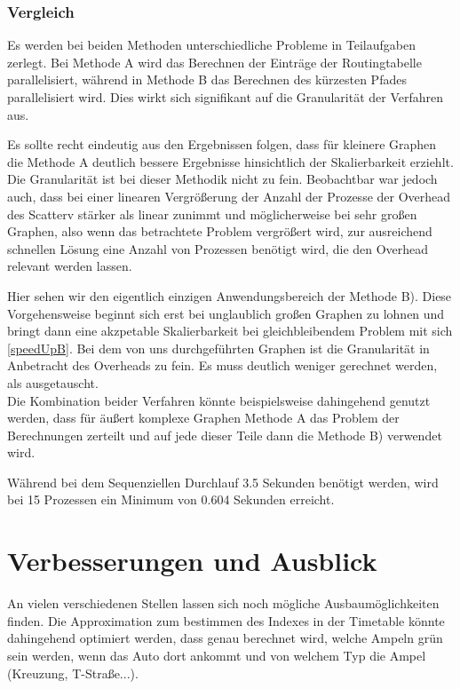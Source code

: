 \documentclass[paper=A4,pagesize=auto,12pt,headinclude=true,footinclude=true,BCOR=0mm,DIV=calc]{scrartcl}
\begin{document}
	\subsubsection{Vergleich}
	Es werden bei beiden Methoden unterschiedliche Probleme in Teilaufgaben zerlegt. Bei Methode A wird das Berechnen der Einträge der Routingtabelle parallelisiert, während in Methode B das Berechnen des kürzesten Pfades parallelisiert wird. Dies wirkt sich signifikant auf die Granularität der Verfahren aus.
	
	Es sollte recht eindeutig aus den Ergebnissen folgen, dass für kleinere Graphen die Methode A deutlich bessere Ergebnisse hinsichtlich der Skalierbarkeit erziehlt. Die Granularität ist bei dieser Methodik nicht zu fein. Beobachtbar war jedoch auch, dass bei einer linearen Vergrößerung der Anzahl der Prozesse der Overhead des Scatterv stärker als linear zunimmt und möglicherweise bei sehr großen Graphen, also wenn das betrachtete Problem vergrößert wird, zur ausreichend schnellen Lösung eine Anzahl von Prozessen benötigt wird, die den Overhead relevant werden lassen.
	
	Hier sehen wir den eigentlich einzigen Anwendungsbereich der Methode B). Diese Vorgehensweise beginnt sich erst bei unglaublich großen Graphen zu lohnen und bringt dann eine akzpetable Skalierbarkeit bei gleichbleibendem Problem mit sich \ref{speedUpB}. Bei dem von uns durchgeführten Graphen ist die Granularität in Anbetracht des Overheads zu fein. Es muss deutlich weniger gerechnet werden, als ausgetauscht.\\
	Die Kombination beider Verfahren könnte beispielsweise dahingehend genutzt werden, dass für äußert komplexe Graphen Methode A das Problem der Berechnungen zerteilt und auf jede dieser Teile dann die Methode B) verwendet wird.

	
	
	
	
	
	
	Während bei dem Sequenziellen Durchlauf 3.5 Sekunden benötigt werden, wird bei 15 Prozessen ein Minimum von 0.604 Sekunden erreicht.
	\section{Verbesserungen und Ausblick}
	An vielen verschiedenen Stellen lassen sich noch mögliche Ausbaumöglichkeiten finden. Die Approximation zum bestimmen des Indexes in der Timetable könnte dahingehend optimiert werden, dass genau berechnet wird, welche Ampeln grün sein werden, wenn das Auto dort ankommt und von welchem Typ die Ampel (Kreuzung, T-Straße...). 
	
\end{document}
